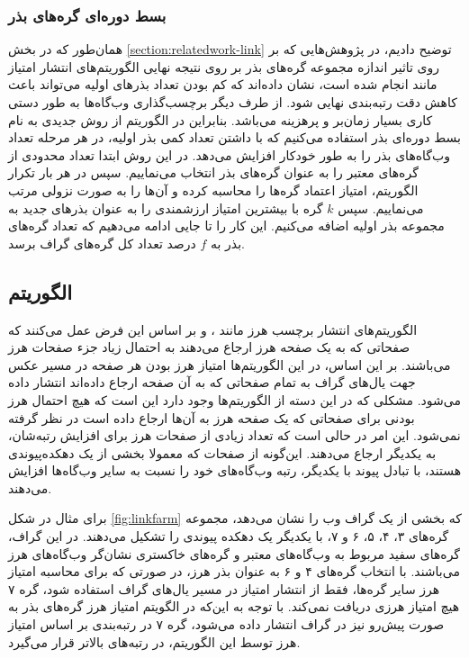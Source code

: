 \documentclass[twoside, a4paper,11pt]{book}
\numberwithin{equation}{chapter}
\numberwithin{table}{chapter}
\numberwithin{figure}{chapter}
\numberwithin{equation}{chapter}
\begin{document}
\subsubsection{بسط دوره‌ای گره‌های بذر}
\label{section:linkbased-wp-seedexpansion}
همان‌طور که در بخش \ref{section:relatedwork-link} توضیح دادیم، در پژوهش‌هایی که بر روی تاثیر اندازه مجموعه گره‌های بذر بر روی نتیجه نهایی الگوریتم‌های انتشار امتیاز مانند  \cite{gyongyi2004combating} انجام شده است، نشان داده‌اند که کم بودن تعداد بذرهای اولیه می‌تواند باعث کاهش دقت رتبه‌بندی نهایی شود. از طرف دیگر برچسب‌گذاری وب‌گاه‌ها به طور دستی کاری بسیار زمان‌بر و پرهزینه می‌باشد. بنابراین در الگوریتم  از روش جدیدی به نام بسط دوره‌ای بذر استفاده می‌کنیم که با داشتن تعداد کمی بذر اولیه، در هر مرحله تعداد وب‌گاه‌های بذر را به طور خودکار افزایش می‌دهد. در این روش ابتدا تعداد محدودی از گره‌های معتبر را به عنوان گره‌های بذر انتخاب می‌نماییم. سپس در هر بار تکرار الگوریتم، امتیاز اعتماد گره‌ها را محاسبه کرده و آ‌ن‌ها را به صورت نزولی مرتب می‌نماییم. سپس $k$ گره با بیشترین امتیاز ارزشمندی را به عنوان بذرهای جدید به مجموعه بذر اولیه اضافه می‌کنیم. این کار را تا جایی ادامه می‌دهیم که تعداد گره‌های بذر به $f$ درصد تعداد کل گره‌های گراف برسد.

\subsection{الگوریتم }
\label{section:linkbased-twsp}
الگوریتم‌های انتشار برچسب هرز مانند  \cite{krishnan2006web}،  \cite{zhang2011propagating} و  \cite{liu2013combating} بر اساس این فرض عمل می‌کنند که صفحاتی که به یک صفحه هرز ارجاع می‌دهند به احتمال زیاد جزء صفحات هرز می‌باشند. بر این اساس، در این الگوریتم‌ها امتیاز هرز بودن هر صفحه در مسیر عکس جهت یال‌های گراف به تمام صفحاتی که به آن صفحه ارجاع داده‌اند انتشار داده می‌شود. مشکلی که در این دسته از الگوریتم‌ها وجود دارد این است که هیچ احتمال هرز بودنی برای صفحاتی که یک صفحه هرز به آن‌ها ارجاع داده است در نظر گرفته نمی‌شود. این امر در حالی است که تعداد زیادی از صفحات هرز برای افزایش رتبه‌شان، به یکدیگر ارجاع می‌دهند. این‌گونه از صفحات که معمولا بخشی از یک دهکده‌پیوندی هستند، با تبادل پیوند با یکدیگر، رتبه وب‌گاه‌های خود را نسبت به سایر وب‌گاه‌ها افزایش می‌دهند. 

برای مثال در شکل \ref{fig:linkfarm} که بخشی از یک گراف وب را نشان می‌دهد، مجموعه گره‌های ۳، ۴، ۵، ۶ و ۷، با یکدیگر یک دهکده پیوندی را تشکیل می‌دهند. در این گراف، گره‌های سفید مربوط به وب‌گاه‌های معتبر و گره‌های خاکستری نشان‌گر وب‌گاه‌های هرز می‌باشند. با انتخاب گره‌های ۴ و ۶ به عنوان بذر هرز، در صورتی که برای محاسبه امتیاز هرز سایر گره‌ها، فقط از انتشار امتیاز در مسیر یال‌های گراف استفاده شود، گره ۷ هیچ امتیاز هرزی دریافت نمی‌کند. 
با توجه به این‌که در الگویتم  امتیاز هرز گره‌های بذر به صورت پیش‌رو نیز در گراف انتشار داده می‌شود، گره ۷ در رتبه‌بندی بر اساس امتیاز هرز توسط این الگوریتم، در رتبه‌های بالاتر قرار می‌گیرد.
\end{document}
